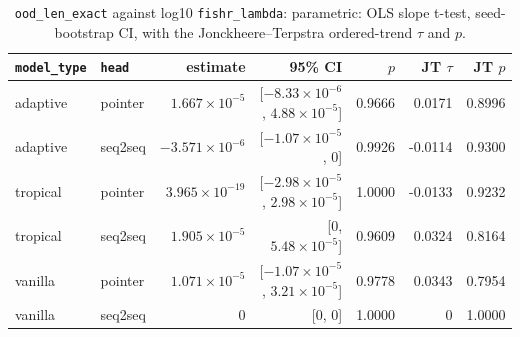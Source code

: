 \documentclass[10pt]{article}
\begin{document}
{\small
\begin{longtable}{llrrrrr}
\caption{\texttt{ood\_len\_exact} against log10 \texttt{fishr\_lambda}: parametric: OLS slope t-test, seed-bootstrap CI, with the Jonckheere--Terpstra ordered-trend $\tau$ and $p$.}\label{tab:trend-ood_len_exact}\\
\toprule
\texttt{model\_type} & \texttt{head} & estimate & 95\% CI & $p$ & JT $\tau$ & JT $p$\\
\midrule
\endhead
adaptive & pointer & $1.667\times10^{-5}$ & [$-8.33\times10^{-6}$, $4.88\times10^{-5}$] & 0.9666 & 0.0171 & 0.8996\\
adaptive & seq2seq & $-3.571\times10^{-6}$ & [$-1.07\times10^{-5}$, 0] & 0.9926 & -0.0114 & 0.9300\\
tropical & pointer & $3.965\times10^{-19}$ & [$-2.98\times10^{-5}$, $2.98\times10^{-5}$] & 1.0000 & -0.0133 & 0.9232\\
tropical & seq2seq & $1.905\times10^{-5}$ & [0, $5.48\times10^{-5}$] & 0.9609 & 0.0324 & 0.8164\\
vanilla & pointer & $1.071\times10^{-5}$ & [$-1.07\times10^{-5}$, $3.21\times10^{-5}$] & 0.9778 & 0.0343 & 0.7954\\
vanilla & seq2seq & 0 & [0, 0] & 1.0000 & 0 & 1.0000\\
\bottomrule
\end{longtable}
}
\end{document}
